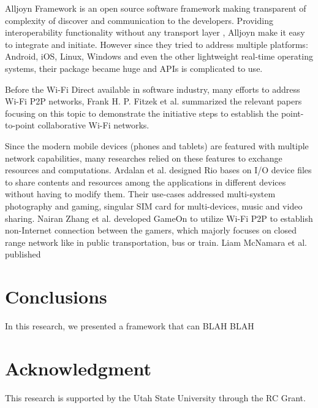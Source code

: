 \documentclass[conference]{IEEEtran}
\begin{document}
Alljoyn Framework \cite{alljoyn} is an open source software framework making transparent of complexity of discover and communication to the developers. Providing interoperability functionality without any transport layer , Alljoyn make it easy to integrate and initiate. However since they tried to address multiple platforms: Android, iOS, Linux, Windows and even the other lightweight real-time operating systems, their package became huge and APIs is complicated to use. 

Before the Wi-Fi Direct available in software industry, many efforts to address Wi-Fi P2P networks, Frank H. P. Fitzek et al. \cite{m_p2p_tutor} summarized the relevant papers focusing on this topic to demonstrate the initiative steps to establish the point-to-point collaborative Wi-Fi networks. 

Since the modern mobile devices (phones and tablets) are featured with multiple network capabilities, many researches relied on these features to exchange resources and computations. Ardalan et al. designed Rio \cite{rio} bases on I/O device files to share contents and resources among the applications in different devices without having to modify them. Their use-cases addressed multi-system photography and gaming, singular SIM card for multi-devices, music and video sharing. Nairan Zhang et al. developed GameOn \cite{gameon} to utilize Wi-Fi P2P to establish non-Internet connection between the gamers, which majorly focuses on closed range network like in public transportation, bus or train. Liam McNamara et al. published \cite{media_share}


\cite{shi+:mobisys14}

\section{Conclusions}
\label{sec:conc}
In this research, we presented a framework that can BLAH BLAH

\section*{Acknowledgment}
This research is supported by the Utah State University through the RC Grant.


\end{document}
